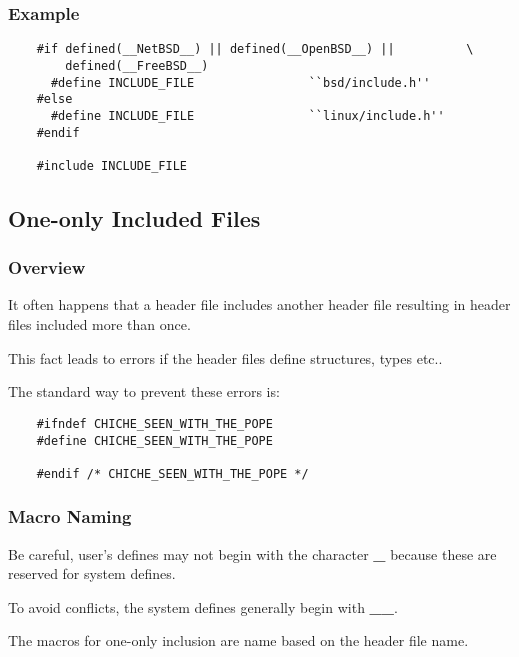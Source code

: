 {\begin{frame}[containsverbatim]
  \frametitle{Example}

  \begin{verbatim}
    #if defined(__NetBSD__) || defined(__OpenBSD__) ||          \
        defined(__FreeBSD__)
      #define INCLUDE_FILE                ``bsd/include.h''
    #else
      #define INCLUDE_FILE                ``linux/include.h''
    #endif

    #include INCLUDE_FILE
  \end{verbatim}
\end{frame}

%
%

\subsection{One-only Included Files}


\begin{frame}[containsverbatim]
  \frametitle{Overview}

  It often happens that a header file includes another header file resulting
  in header files included more than once.

  \nl

  This fact leads to errors if the header files define structures, types etc..

  \nl

  The standard way to prevent these errors is:

  \begin{verbatim}
    #ifndef CHICHE_SEEN_WITH_THE_POPE
    #define CHICHE_SEEN_WITH_THE_POPE

    #endif /* CHICHE_SEEN_WITH_THE_POPE */
  \end{verbatim}
\end{frame}


\begin{frame}
  \frametitle{Macro Naming}

  Be careful, user's defines may not begin with the character \textbf{\_}
  because these are reserved for system defines.

  \nl

  To avoid conflicts, the system defines generally begin with \textbf{\_\_}.

  \nl

  The macros for one-only inclusion are name based on the header file name.


\end{frame}}
